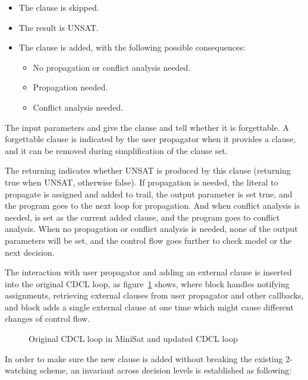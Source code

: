 \begin{itemize}
  \item The clause is skipped.
  \item The result is UNSAT.
  \item The clause is added, with the following possible consequences:
    \begin{itemize}
      \item No propagation or conflict analysis needed.
      \item Propagation needed.
      \item Conflict analysis needed.
    \end{itemize}
\end{itemize}

The input parameters  and  give the clause and tell whether it is forgettable. A forgettable clause is indicated by the user propagator when it provides a clause, and it can be removed during simplification of the clause set.

The returning  indicates whether UNSAT is produced by this clause (returning true when UNSAT, otherwise false). If propagation is needed, the literal to propagate is assigned and added to trail, the output parameter  is set true, and the program goes to the next loop for propagation. And when conflict analysis is needed,  is set as the current added clause, and the program goes to conflict analysis. When no propagation or conflict analysis is needed, none of the output parameters will be set, and the control flow goes further to check model or the next decision.

The interaction with user propagator and adding an external clause is inserted into the original CDCL loop, as figure~\ref{fig:flow} shows, where  block handles notifying assignments, retrieving external clauses from user propagator and other callbacks, and  block adds a single external clause at one time which might cause different changes of control flow.

\begin{figure}[h!]
  \centering
  
  \caption{Original CDCL loop in MiniSat and updated CDCL loop}
  \label{fig:flow}
\end{figure}

In order to make sure the new clause is added without breaking the existing 2-watching scheme, an invariant across decision levels is established as following:

